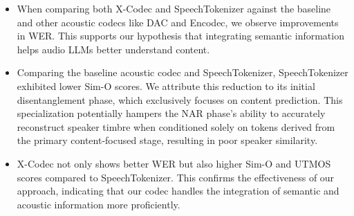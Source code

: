 \begin{itemize}
\item When comparing both X-Codec and SpeechTokenizer against the baseline and other acoustic codecs like DAC and Encodec, we observe improvements in WER. This supports our hypothesis that integrating semantic information helps audio LLMs better understand content.
\item Comparing the baseline acoustic codec and SpeechTokenizer, SpeechTokenizer exhibited lower Sim-O scores. We attribute this reduction to its initial disentanglement phase, which exclusively focuses on content prediction. This specialization potentially hampers the NAR phase's ability to accurately reconstruct speaker timbre when conditioned solely on tokens derived from the primary content-focused stage, resulting in poor speaker similarity.
\item  X-Codec not only shows better WER but also higher Sim-O and UTMOS scores compared to SpeechTokenizer. This confirms the effectiveness of our approach, indicating that our codec handles the integration of semantic and acoustic information more proficiently.
\end{itemize}


\begin{table}
\centering
{}
\caption{Comparison of Phonetic Discriminability within and across  ABX error rate for various models, with different $n_q$ values. Lower values indicate better performance.}
\label{abx}
\end{table}



